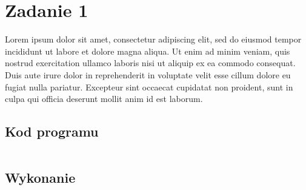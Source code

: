 \section{Zadanie 1}
\begin{large}
    Lorem ipsum dolor sit amet, consectetur adipiscing elit, sed do eiusmod tempor incididunt ut labore et dolore magna aliqua. Ut enim ad minim veniam, quis nostrud exercitation ullamco laboris nisi ut aliquip ex ea commodo consequat. Duis aute irure dolor in reprehenderit in voluptate velit esse cillum dolore eu fugiat nulla pariatur. Excepteur sint occaecat cupidatat non proident, sunt in culpa qui officia deserunt mollit anim id est laborum.
\end{large}
\subsection{Kod programu}
\begin{Large}
    \inputminted[linenos]{java}{code/HelloWorld.java}
\end{Large}
\subsection{Wykonanie}
\begin{Large}
    \inputminted{text}{code/out/HelloWorld.out}
\end{Large}
